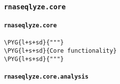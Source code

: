 \subsubsection{\texttt{rnaseqlyze.core}}
\label{index-pdf4:rnaseqlyze-core}

\paragraph{\texttt{rnaseqlyze.core}}
\label{index-pdf4:id2}
\begin{Verbatim}[commandchars=\\\{\}]
\PYG{l+s+sd}{"""}
\PYG{l+s+sd}{Core functionality}
\PYG{l+s+sd}{"""}
\end{Verbatim}


\paragraph{\texttt{rnaseqlyze.core.analysis}}
\label{index-pdf4:rnaseqlyze-core-analysis}
